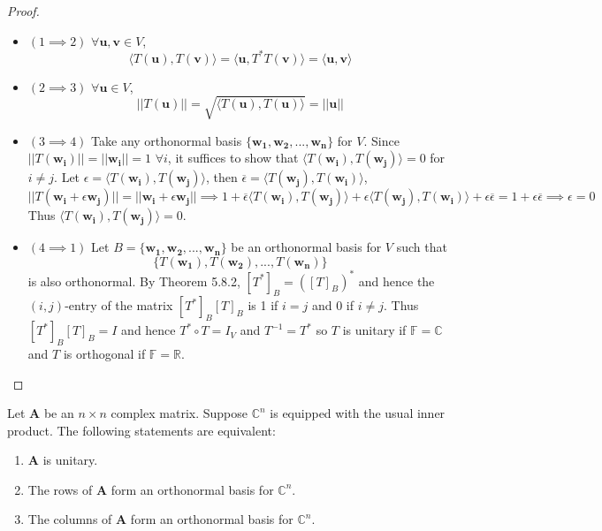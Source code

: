 \documentclass[a4paper]{article}
\begin{document}
\begin{proof}\leavevmode
\begin{itemize}
    \item $(1\implies2)$ $\forall\mathbf{u},\mathbf{v}\in V$, 
    $$\langle T(\mathbf{u}),T(\mathbf{v})\rangle=\langle\mathbf{u},T^*T(\mathbf{v})\rangle=\langle\mathbf{u},\mathbf{v}\rangle$$
    \item $(2\implies3)$ $\forall\mathbf{u}\in V$,
    $$||T(\mathbf{u})||=\sqrt{\langle T(\mathbf{u}),T(\mathbf{u})\rangle}=||\mathbf{u}||$$
    \item $(3\implies 4)$ Take any orthonormal basis $\{\mathbf{w_1},\mathbf{w_2},...,\mathbf{w_n}\}$ for $V$. Since $||T(\mathbf{w_i})||=||\mathbf{w_i}||=1$ $\forall i$, it suffices to show that $\langle T(\mathbf{w_i}),T(\mathbf{w_j})\rangle=0$ for $i\neq j$. Let $\epsilon=\langle T(\mathbf{w_i}),T(\mathbf{w_j})\rangle$, then $\overline{\epsilon}=\langle T(\mathbf{w_j}),T(\mathbf{w_i})\rangle$,
    $$||T(\mathbf{w_i}+\epsilon\mathbf{w_j})||=||\mathbf{w_i}+\epsilon\mathbf{w_j}||\implies 1+\overline{\epsilon}\langle T(\mathbf{w_i}),T(\mathbf{w_j})\rangle+\epsilon\langle T(\mathbf{w_j}), T(\mathbf{w_i})\rangle+\epsilon\overline{\epsilon}=1+\epsilon\overline{\epsilon}\implies\epsilon=0$$
    Thus $\langle T(\mathbf{w_i}),T(\mathbf{w_j})\rangle=0$.
    \item $(4\implies 1)$ Let $B=\{\mathbf{w_1},\mathbf{w_2},...,\mathbf{w_n}\}$ be an orthonormal basis for $V$ such that $$\{T(\mathbf{w_1}),T(\mathbf{w_2}),...,T(\mathbf{w_n})\}$$ is also orthonormal. By Theorem 5.8.2, $[T^*]_B=([T]_B)^*$ and hence the $(i,j)$-entry of the matrix $[T^*]_B[T]_B$ is 1 if $i=j$ and 0 if $i\neq j$. Thus $[T^*]_B[T]_B=I$ and hence $T^*\circ T=I_V$ and $T^{-1}=T^*$ so $T$ is unitary if $\mathbb{F}=\mathbb{C}$ and $T$ is orthogonal if $\mathbb{F}=\mathbb{R}$.
\end{itemize}
\end{proof}
\begin{thm}
Let $\mathbf{A}$ be an $n\times n$ complex matrix. Suppose $\mathbb{C}^n$ is equipped with the usual inner product. The following statements are equivalent:
\begin{enumerate}
    \item $\mathbf{A}$ is unitary.
    \item The rows of $\mathbf{A}$ form an orthonormal basis for $\mathbb{C}^n$.
    \item The columns of $\mathbf{A}$ form an orthonormal basis for $\mathbb{C}^n$.
\end{enumerate}
\end{thm}
\end{document}
